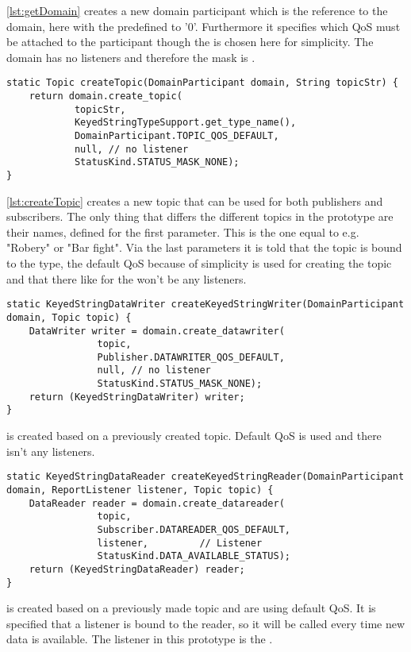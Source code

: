 \documentclass[Main]{subfiles}
\begin{document}
\codeTitle \ref{lst:getDomain} creates a new domain participant which is the reference to the domain, here with the  predefined to '0'.
Furthermore it specifies which QoS must be attached to the participant though the  is chosen here for simplicity.
The domain has no listeners and therefore the mask is .

\begin{lstlisting}[caption=RTIHelper: createTopic, style=Code-Java, label=lst:createTopic]
static Topic createTopic(DomainParticipant domain, String topicStr) {
	return domain.create_topic(
			topicStr, 
			KeyedStringTypeSupport.get_type_name(), 
			DomainParticipant.TOPIC_QOS_DEFAULT, 
			null, // no listener
			StatusKind.STATUS_MASK_NONE);
}
\end{lstlisting}


\codeTitle \ref{lst:createTopic} creates a new topic that can be used for both publishers and subscribers. 
The only thing that differs the different topics in the prototype are their names, defined for the first parameter.
 This is the one equal to e.g. "Robery" or "Bar fight". 
 Via the last parameters it is told that the topic is bound to the  type, the default QoS because of simplicity is used for creating the topic and that there like for the  won't be any listeners. 

\begin{lstlisting}[caption=RTIHelper: createKeyedStringWriter, style=Code-Java, label=lst:createKeyedStringWriter]
static KeyedStringDataWriter createKeyedStringWriter(DomainParticipant domain, Topic topic) {
	DataWriter writer = domain.create_datawriter(
				topic, 
				Publisher.DATAWRITER_QOS_DEFAULT,
				null, // no listener
				StatusKind.STATUS_MASK_NONE);
	return (KeyedStringDataWriter) writer;
}
\end{lstlisting}

 is created based on a previously created topic. 
Default QoS  is used and there isn't any listeners.


\begin{lstlisting}[caption=RTIHelper: createKeyedStringReader, style=Code-Java, label=lst:createKeyedStringReader]
static KeyedStringDataReader createKeyedStringReader(DomainParticipant domain, ReportListener listener, Topic topic) {
	DataReader reader = domain.create_datareader(
				topic, 
				Subscriber.DATAREADER_QOS_DEFAULT,
				listener,         // Listener
				StatusKind.DATA_AVAILABLE_STATUS);
	return (KeyedStringDataReader) reader;
} 
\end{lstlisting}

 is created based on a previously made topic and are using default QoS. 
It is specified that a listener is bound to the reader, so it will be called every time new data is available. 
The listener in this prototype is the .
\end{document}
